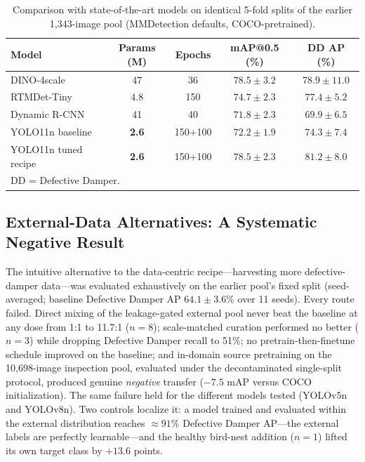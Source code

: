 \documentclass[conference]{IEEEtran}
\makeatletter
\newcommand{\dd}{Defective Damper}
\newcommand{\map}{mAP@0.5}
\makeatother
\begin{document}
\begin{table}[t]
\caption{Comparison with state-of-the-art models on identical 5-fold splits of the earlier 1{,}343-image pool (MMDetection defaults, COCO-pretrained).}
\label{tab:sota}
\centering
\scriptsize
\setlength{\tabcolsep}{3pt}
\begin{tabular}{lcccc}
\toprule
Model & Params (M) & Epochs & \map{} (\%) & DD AP (\%) \\
\midrule
DINO-4scale \cite{zhang2023dino} & 47 & 36 & $\mathbf{78.5 \pm 3.2}$ & $78.9 \pm 11.0$ \\
RTMDet-Tiny \cite{lyu2022rtmdet} & 4.8 & 150 & $74.7 \pm 2.3$ & $77.4 \pm 5.2$ \\
Dynamic R-CNN \cite{zhang2020dynamicrcnn} & 41 & 40 & $71.8 \pm 2.3$ & $69.9 \pm 6.5$ \\
\midrule
YOLO11n baseline & \textbf{2.6} & 150+100 & $72.2 \pm 1.9$ & $74.3 \pm 7.4$ \\
YOLO11n tuned recipe & \textbf{2.6} & 150+100 & $\mathbf{78.5 \pm 2.3}$ & $\mathbf{81.2 \pm 8.0}$ \\
\bottomrule
\multicolumn{5}{l}{DD = \dd{}.}
\end{tabular}
\end{table}

\subsection{External-Data Alternatives: A Systematic Negative Result}
\label{sec:external}
The intuitive alternative to the data-centric recipe---harvesting more defective-damper data---was evaluated exhaustively on the earlier pool's fixed split (seed-averaged; baseline \dd{} AP $64.1 \pm 3.6$\% over 11 seeds). Every route failed. Direct mixing of the leakage-gated external pool never beat the baseline at any dose from 1:1 to 11.7:1 ($n{=}8$); scale-matched curation performed no better ($n{=}3$) while dropping \dd{} recall to 51\%; no pretrain-then-finetune schedule improved on the baseline; and in-domain source pretraining on the 10{,}698-image inspection pool, evaluated under the decontaminated single-split protocol, produced genuine \emph{negative} transfer ($-7.5$ mAP versus COCO initialization). The same failure held for the different models tested (YOLOv5n and YOLOv8n). Two controls localize it: a model trained and evaluated within the external distribution reaches ${\approx}91\%$ \dd{} AP---the external labels are perfectly learnable---and the healthy bird-nest addition ($n{=}1$) lifted its own target class by $+13.6$ points.
\end{document}
